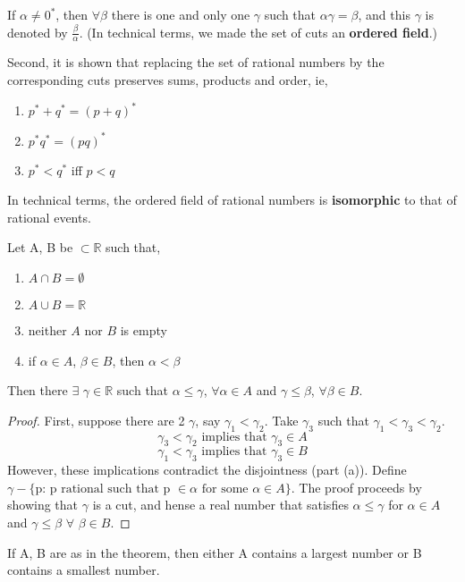 \documentclass[11pt,fleqn]{book} %
\begin{document}
If $\alpha \neq 0^*$, then $\forall \beta$ there is one and only one $\gamma$ such that $\alpha\gamma = \beta$, and this $\gamma$ is denoted by $\frac{\beta}{\alpha}$. (In technical terms, we made the set of cuts an \textbf{ordered field}.)

Second, it is shown that replacing the set of rational numbers by the corresponding cuts preserves sums, products and order, ie,

\begin{enumerate}
	\item $p^* + q^* =(p + q)^*$ 
	\item $p^*q^* = (pq)^*$
	\item $p^* < q^*$ iff $p<q$
\end{enumerate}
In technical terms, the ordered field of rational numbers is \textbf{isomorphic} to that of rational events.

\begin{theorem}[Dedekind]
	Let A, B be $\subset \mathbb{R}$ such that,
	\begin{enumerate}[label = (\alph*)]
		\item $A \cap B = \emptyset$
		\item $A \cup B = \mathbb{R}$
		\item neither $A$ nor $B$ is empty
		\item if $\alpha \in A$, $\beta \in B$, then $\alpha < \beta$
	\end{enumerate}
	Then there $\exists$ $\gamma \in \mathbb{R}$ such that $\alpha \le \gamma$, $\forall \alpha \in A$ and $\gamma \le \beta$, $\forall \beta \in B$. 
\end{theorem}

\begin{proof}
	First, suppose there are 2 $\gamma$, say $\gamma_1 < \gamma_2$. Take $\gamma_3$ such that $\gamma_1 < \gamma_3 < \gamma_2$.
	$$\gamma_3 < \gamma_2 \text{ implies that } \gamma_3 \in A$$
	$$\gamma_1 < \gamma_3 \text{ implies that } \gamma_3 \in B$$
However, these implications contradict the disjointness (part (a)). 
Define $\gamma - \{\text{p: p rational such that p }\in \alpha \text{ for some }\alpha \in A\}$. The proof proceeds by showing that $\gamma$ is a cut, and hense a real number that satisfies $\alpha \le \gamma$ for $\alpha \in A$ and $\gamma \le \beta$ $\forall$ $\beta \in B$.
\end{proof}

\begin{corollary}
	If A, B are as in the theorem, then either A contains a largest number or B contains a smallest number. 
\end{corollary}
\end{document}
